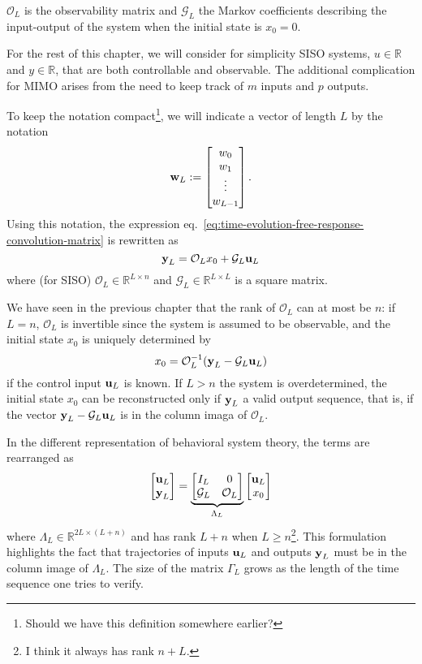 $\mathcal{O}_L$ is the observability matrix and $\mathcal{G}_L$ the Markov coefficients describing the input-output of the system when the initial state is $x_0=0$.

For the rest of this chapter, we will consider for simplicity SISO systems, $u\in \mathbb{R}$ and $y\in \mathbb{R}$, that are both controllable and observable. The additional complication for MIMO arises from the need to keep track of $m$ inputs and $p$ outputs.

To keep the notation compact\footnote{Should we have this definition somewhere earlier?}, we will indicate a vector of length $L$ by the notation
\begin{equation*}
  \boldsymbol{\mathrm{w}}_L :=
  \begin{bmatrix}
    w_0 \\ w_1 \\ \vdots \\ w_{L-1}
  \end{bmatrix}.
\end{equation*}
Using this notation, the expression eq.~\eqref{eq:time-evolution-free-response-convolution-matrix} is rewritten as
\begin{equation*}
  \boldsymbol{\mathrm{y}}_L = \mathcal{O}_Lx_0 + \mathcal{G}_L\boldsymbol{\mathrm{u}}_L
\end{equation*}
where (for SISO) $\mathcal{O}_L\in\mathbb{R}^{L\times n}$ and $\mathcal{G}_L\in \mathbb{R}^{L\times L}$ is a square matrix.

We have seen in the previous chapter that the rank of $\mathcal{O}_L$ can at most be $n$: if $L=n$, $\mathcal{O}_L$ is invertible since the system is assumed to be observable, and the initial state $x_0$ is uniquely determined by
\begin{equation*}
  x_0 = \mathcal{O}_L^{-1}(\boldsymbol{\mathrm{y}}_L - \mathcal{G}_L\boldsymbol{\mathrm{u}}_L)
\end{equation*}
if the control input $\boldsymbol{\mathrm{u}}_L$ is known. If $L>n$ the system is overdetermined, the initial state $x_0$ can be reconstructed only if $\boldsymbol{\mathrm{y}}_L$ a valid output sequence, that is, if the vector $\boldsymbol{\mathrm{y}}_L - \mathcal{G}_L\boldsymbol{\mathrm{u}}_L$ is in the column imaga of $\mathcal{O}_L$.

In the different representation of behavioral system theory, the terms are rearranged as
\begin{equation*}
  \begin{bmatrix}
    \boldsymbol{\mathrm{u}}_L \\ \boldsymbol{\mathrm{y}}_L
  \end{bmatrix} = \underbrace{
  \begin{bmatrix}
    I_L & 0 \\ \mathcal{G}_L & \mathcal{O}_L
  \end{bmatrix}}_{\Lambda_L}
\begin{bmatrix}
  \boldsymbol{\mathrm{u}}_L \\ x_0
\end{bmatrix}
\end{equation*}
where $\Lambda_L\in \mathbb{R}^{2L\times(L+n)}$ and has rank $L+n$ when $L\ge n$\footnote{I think it always has rank $n+L$.}. This formulation highlights the fact that trajectories of inputs $\boldsymbol{\mathrm{u}}_L$ and outputs $\boldsymbol{\mathrm{y}}_L$ must be in the column image of $\Lambda_L$. The size of the matrix $\Gamma_L$ grows as the length of the time sequence one tries to verify.

